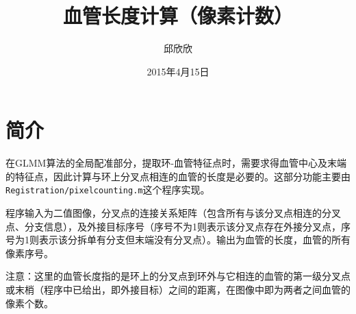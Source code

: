 \documentclass[12pt]{article}
\begin{document}
\title{\vspace{-2em}血管长度计算（像素计数）\vspace{-0.7em}}
\author{邱欣欣}
\date{\vspace{-0.7em}2015年4月15日\vspace{-0.7em}}
\maketitle\thispagestyle{fancy}

\section{简介}
在GLMM算法的全局配准部分，提取环-血管特征点时，需要求得血管中心及末端的特征点，因此计算与环上分叉点相连的血管的长度是必要的。这部分功能主要由 \verb|Registration/pixelcounting.m|这个程序实现。

程序输入为二值图像，分叉点的连接关系矩阵（包含所有与该分叉点相连的分叉点、分支信息），及外接目标序号（序号不为1则表示该分叉点存在外接分叉点，序号为1则表示该分拆单有分支但末端没有分叉点）。输出为血管的长度，血管的所有像素序号。

注意：这里的血管长度指的是环上的分叉点到环外与它相连的血管的第一级分叉点或末梢（程序中已给出，即外接目标）之间的距离，在图像中即为两者之间血管的像素个数。
\end{document}
